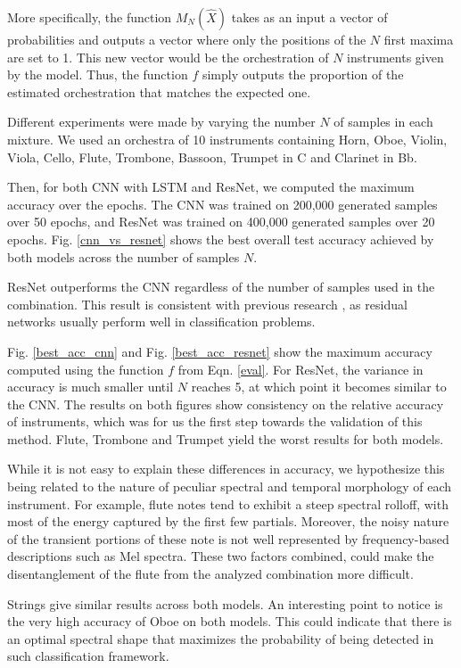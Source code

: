 \documentclass[runningheads,a4paper]{llncs}
\begin{document}
More specifically, the function $M_N(\hat{X})$ takes as an input a vector of probabilities and outputs a vector where only the positions of the $N$ first maxima are set to 1. This new vector would be the orchestration of $N$ instruments given by the model. Thus, the function $f$ simply outputs the proportion of the estimated orchestration that matches the expected one.

Different experiments were made by varying the number $N$ of samples in each mixture. We used an orchestra of 10 instruments containing Horn, Oboe, Violin, Viola, Cello, Flute, Trombone, Bassoon, Trumpet in C and Clarinet in Bb.

Then, for both CNN with LSTM and ResNet, we computed the maximum accuracy over the epochs. 
The CNN was trained on 200,000 generated samples over 50 epochs, and ResNet was 	trained on 400,000 generated samples over 20 epochs. Fig. \ref{cnn_vs_resnet} shows the best overall test accuracy achieved by both models across the number of samples $N$.

ResNet outperforms the CNN regardless of the number of samples used in the combination. This result is consistent with previous research \cite{He15}, as residual networks usually perform well in classification problems.

Fig. \ref{best_acc_cnn} and Fig. \ref{best_acc_resnet} show the maximum accuracy computed using the function $f$ from Eqn. \ref{eval}. For ResNet, the variance in accuracy is much smaller until $N$ reaches 5, at which point it becomes similar to the CNN. The results on both figures show consistency on the relative accuracy of instruments, which was for us the first step towards the validation of this method. Flute, Trombone and Trumpet yield the worst results for both models. 

While it is not easy to explain these differences in accuracy, we hypothesize this being related to the nature of peculiar spectral and temporal morphology of each instrument. For example, flute notes tend to exhibit a steep spectral rolloff, with most of the energy captured by the first few partials. Moreover, the noisy nature of the transient portions of these note is not well represented by frequency-based descriptions such as Mel spectra. These two factors combined, could make the disentanglement of the flute from the analyzed combination more difficult.

Strings give similar results across both models. An interesting point to notice is the very high accuracy of Oboe on both models. This could indicate that there is an optimal spectral shape that maximizes the probability of being detected in such classification framework.
\end{document}
